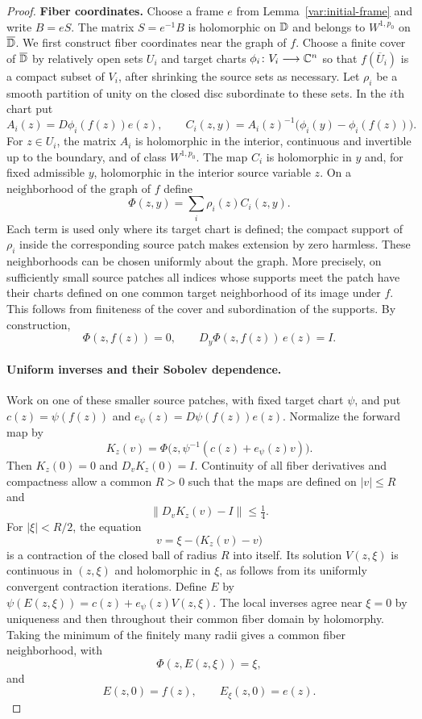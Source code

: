 \begin{proof}
\textbf{Fiber coordinates.}
Choose a frame $e$ from Lemma~\ref{var:initial-frame} and write
$B=eS$. The matrix $S=e^{-1}B$ is holomorphic on $\mathbb D$ and belongs
to $W^{1,p_0}$ on $\overline{\mathbb D}$. We first construct fiber coordinates near the graph of
$f$.  Choose a finite cover of $\overline{\mathbb D}$ by relatively open
sets $U_i$ and target charts
$\phi_i\colon V_i\longrightarrow\mathbb C^n$ so that $f(\overline U_i)$
is a compact subset of $V_i$, after shrinking the source sets as
necessary.  Let $\rho_i$ be a smooth partition of unity on the
closed disc subordinate to these sets.  In the $i$th chart put
\[
 A_i(z)=D\phi_i(f(z))e(z),\qquad
 C_i(z,y)=A_i(z)^{-1}\bigl(\phi_i(y)-\phi_i(f(z))\bigr).
\]
For $z\in U_i$, the matrix $A_i$ is holomorphic in the interior,
continuous and invertible up to the boundary, and of class $W^{1,p_0}$.
The map $C_i$ is holomorphic in $y$ and, for fixed admissible $y$,
holomorphic in the interior source variable $z$.  On a neighborhood
of the graph of $f$ define
\begin{equation}\label{var:forward-coordinates}
 \Phi(z,y)=\sum_i\rho_i(z)C_i(z,y).
\end{equation}
Each term is used only where its target chart is defined; the compact
support of $\rho_i$ inside the corresponding source patch makes
extension by zero harmless.  These neighborhoods can be chosen
uniformly about the graph.  More precisely, on sufficiently small
source patches all indices whose supports meet the patch have their
charts defined on one common target neighborhood of its image under
$f$.  This follows from finiteness of the cover and subordination of
the supports.  By construction,
\begin{equation}\label{var:coordinate-normalization}
 \Phi(z,f(z))=0,
 \qquad D_y\Phi(z,f(z))\,e(z)=I.
\end{equation}

\paragraph{Uniform inverses and their Sobolev dependence.}
Work on one of these smaller source patches, with fixed target chart
$\psi$, and put $c(z)=\psi(f(z))$ and
$e_\psi(z)=D\psi(f(z))e(z)$.  Normalize the forward map by
\[
 K_z(v)=\Phi\bigl(z,\psi^{-1}(c(z)+e_\psi(z)v)\bigr).
\]
Then $K_z(0)=0$ and $D_vK_z(0)=I$.  Continuity of all fiber
derivatives and compactness allow a common $R>0$ such that the maps
are defined on $|v|\le R$ and
\[
 \|D_vK_z(v)-I\|\le\tfrac14.
\]
For $|\xi|<R/2$, the equation
\[
 v=\xi-\bigl(K_z(v)-v\bigr)
\]
is a contraction of the closed ball of radius $R$ into itself.
Its solution $V(z,\xi)$ is continuous in $(z,\xi)$ and holomorphic
in $\xi$, as follows from its uniformly convergent contraction
iterations.  Define $E$ by
$\psi(E(z,\xi))=c(z)+e_\psi(z)V(z,\xi)$.  The local inverses
agree near $\xi=0$ by uniqueness and then throughout their common
fiber domain by holomorphy.  Taking the minimum of the finitely many
radii gives a common fiber neighborhood, with
\[
 \Phi(z,E(z,\xi))=\xi,
\]
and
\begin{equation}\label{var:inverse-normalization}
 E(z,0)=f(z),\qquad E_\xi(z,0)=e(z).
\end{equation}


\end{proof}
